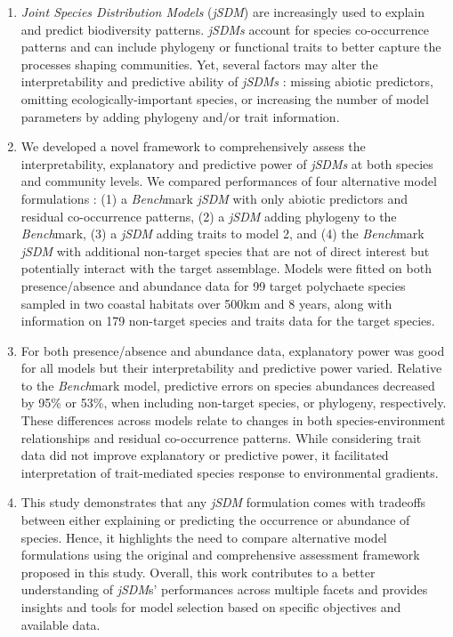 \begin{refsection}
\begin{enumerate}
\def\labelenumi{\arabic{enumi}.}
\item
  \emph{Joint Species Distribution Models} (\emph{jSDM}) are
  increasingly used to explain and predict biodiversity patterns.
  \emph{jSDMs} account for species co-occurrence patterns and can
  include phylogeny or functional traits to better capture the processes
  shaping communities. Yet, several factors may alter the
  interpretability and predictive ability of \emph{jSDMs} : missing
  abiotic predictors, omitting ecologically-important species, or
  increasing the number of model parameters by adding phylogeny and/or
  trait information.
\item
  We developed a novel framework to comprehensively assess the
  interpretability, explanatory and predictive power of \emph{jSDMs} at
  both species and community levels. We compared performances of four
  alternative model formulations : (1) a \emph{Bench}mark \emph{jSDM}
  with only abiotic predictors and residual co-occurrence patterns, (2)
  a \emph{jSDM} adding phylogeny to the \emph{Bench}mark, (3) a
  \emph{jSDM} adding traits to model 2, and (4) the \emph{Bench}mark
  \emph{jSDM} with additional non-target species that are not of direct
  interest but potentially interact with the target assemblage. Models
  were fitted on both presence/absence and abundance data for 99 target
  polychaete species sampled in two coastal habitats over 500km and 8
  years, along with information on 179 non-target species and traits
  data for the target species.
\item
  For both presence/absence and abundance data, explanatory power was
  good for all models but their interpretability and predictive power
  varied. Relative to the \emph{Bench}mark model, predictive errors on
  species abundances decreased by 95\% or 53\%, when including
  non-target species, or phylogeny, respectively. These differences
  across models relate to changes in both species-environment
  relationships and residual co-occurrence patterns. While considering
  trait data did not improve explanatory or predictive power, it
  facilitated interpretation of trait-mediated species response to
  environmental gradients.
\item
  This study demonstrates that any \emph{jSDM} formulation comes with
  tradeoffs between either explaining or predicting the occurrence or
  abundance of species. Hence, it highlights the need to compare
  alternative model formulations using the original and comprehensive
  assessment framework proposed in this study. Overall, this work
  contributes to a better understanding of \emph{jSDM}s' performances
  across multiple facets and provides insights and tools for model
  selection based on specific objectives and available data.
\end{enumerate}


\end{refsection}
